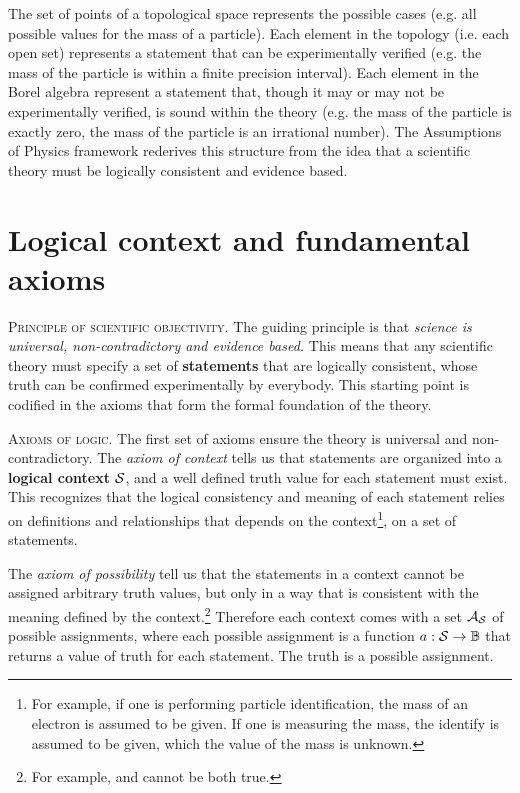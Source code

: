 \documentclass[10pt,twocolumn, nofootinbib]{revtex4-1}
\newcommand\partitle[1]{\textsc{#1}.}
\begin{document}
The set of points of a topological space represents the possible cases (e.g. all possible values for the mass of a particle). Each element in the topology (i.e. each open set) represents a statement that can be experimentally verified (e.g. the mass of the particle is within a finite precision interval). Each element in the Borel algebra represent a statement that, though it may or may not be experimentally verified, is sound within the theory (e.g. the mass of the particle is exactly zero, the mass of the particle is an irrational number). The Assumptions of Physics framework rederives this structure from the idea that a scientific theory must be logically consistent and evidence based.

\section{Logical context and fundamental axioms}

\partitle{Principle of scientific objectivity} The guiding principle is that \emph{science is universal, non-contradictory and evidence based.} This means that any scientific theory must specify a set of \textbf{statements} that are logically consistent, whose truth can be confirmed experimentally by everybody. This starting point is codified in the axioms that form the formal foundation of the theory.

\partitle{Axioms of logic} The first set of axioms ensure the theory is universal and non-contradictory. The \emph{axiom of context} tells us that statements are organized into a \textbf{logical context} $\mathcal{S}$, and a well defined truth value for each statement must exist. This recognizes that the logical consistency and meaning of each statement relies on definitions and relationships that depends on the context\footnote{For example, if one is performing particle identification, the mass of an electron is assumed to be given. If one is measuring the mass, the identify is assumed to be given, which the value of the mass is unknown.}, on a set of statements.

The \emph{axiom of possibility} tell us that the statements in a context cannot be assigned arbitrary truth values, but only in a way that is consistent with the meaning defined by the context.\footnote{For example,  and  cannot be both true.} Therefore each context comes with a set $\mathcal{A}_{\mathcal{S}}$ of possible assignments, where each possible assignment is a function $a : \mathcal{S} \to \mathbb{B}$ that returns a value of truth for each statement. The truth is a possible assignment.
\end{document}
